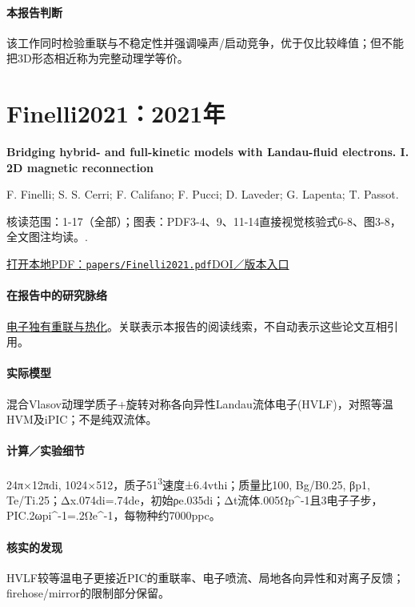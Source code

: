 \paragraph{本报告判断}该工作同时检验重联与不稳定性并强调噪声/启动竞争，优于仅比较峰值；但不能把3D形态相近称为完整动理学等价。

\section{Finelli2021：2021年}\label{paper:Finelli2021}

\textbf{Bridging hybrid- and full-kinetic models with Landau-fluid electrons. I. 2D magnetic reconnection}\citep{Finelli2021}\

F. Finelli;  S. S. Cerri;  F. Califano;  F. Pucci;  D. Laveder;  G. Lapenta;  T. Passot.

\textsf{核读范围：}1-17（全部）；\textsf{图表：}PDF3-4、9、11-14直接视觉核验式6-8、图3-8，全文图注均读。.

\href{run:papers/Finelli2021.pdf}{打开本地PDF：\texttt{papers/Finelli2021.pdf}}\quad\href{https://doi.org/10.1051/0004-6361/202140279}{DOI／版本入口}

\paragraph{在报告中的研究脉络}\hyperref[story:energy]{电子独有重联与热化}。关联表示本报告的阅读线索，不自动表示这些论文互相引用。

\paragraph{实际模型}混合Vlasov动理学质子+旋转对称各向异性Landau流体电子(HVLF)，对照等温HVM及iPIC；不是纯双流体。

\paragraph{计算／实验细节}24π×12πdi, 1024×512，质子51\textsuperscript{3}速度±6.4vthi；质量比100, Bg/B0.25, βp1, Te/Ti.25；Δx.074di=.74de，初始ρe.035di；Δt流体.005Ωp\textasciicircum{}-1且3电子子步，PIC.2ωpi\textasciicircum{}-1=.2Ωe\textasciicircum{}-1，每物种约7000ppc。

\paragraph{核实的发现}HVLF较等温电子更接近PIC的重联率、电子喷流、局地各向异性和对离子反馈；firehose/mirror的限制部分保留。

